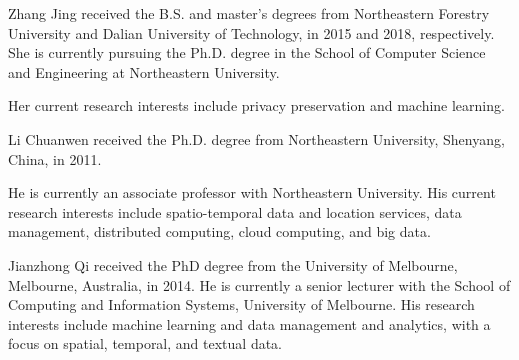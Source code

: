 \documentclass[10pt,journal,compsoc]{IEEEtran}
\begin{document}
\begin{IEEEbiography}{Zhang Jing}
	received the B.S. and master’s degrees from Northeastern Forestry University and Dalian University of Technology, in 2015 and 2018, respectively. She is currently pursuing the Ph.D. degree in the School of Computer Science and Engineering at Northeastern University.
	
	Her current research interests include privacy preservation and machine learning.
\end{IEEEbiography}


\begin{IEEEbiography}{Li Chuanwen}
	received the Ph.D. degree from Northeastern University, Shenyang, China, in 2011.
	
	He is currently an associate professor with Northeastern University. His current research interests include spatio-temporal data and location services, data management, distributed computing, cloud computing, and big data.
\end{IEEEbiography}

\begin{IEEEbiography}{Jianzhong Qi}
	 received the PhD degree from the University of Melbourne, Melbourne, Australia, in 2014. He is currently a senior lecturer with the School of Computing and Information Systems, University of Melbourne. His research interests include machine learning and data management and analytics, with a focus on spatial, temporal, and textual data.
\end{IEEEbiography}
\end{document}
